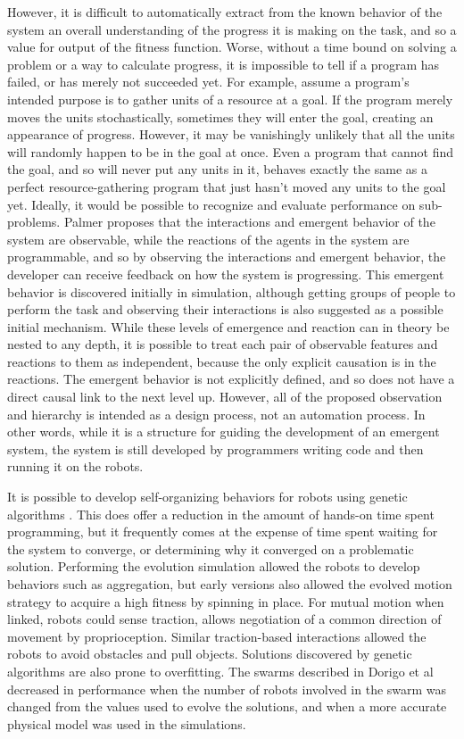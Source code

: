 \documentclass[]{article}
\begin{document}
However, it is difficult to automatically extract from the known behavior of the system an overall understanding of the progress it is making on the task, and so a value for output of the fitness function. 
Worse, without a time bound on solving a problem or a way to calculate progress, it is impossible to tell if a program has failed, or has merely not succeeded yet.
For example, assume a program's intended purpose is to gather units of a resource at a goal. 
If the program merely moves the units stochastically, sometimes they will enter the goal, creating an appearance of progress. 
However, it may be vanishingly unlikely that all the units will randomly happen to be in the goal at once. 
Even a program that cannot find the goal, and so will never put any units in it, behaves exactly the same as a perfect resource-gathering program that just hasn't moved any units to the goal yet. 
Ideally, it would be possible to recognize and evaluate performance on sub-problems. 
Palmer proposes that the interactions and emergent behavior of the system are observable, while the reactions of the agents in the system are programmable, and so by observing the interactions and emergent behavior, the developer can receive feedback on how the system is progressing. 
This emergent behavior is discovered initially in simulation, although getting groups of people to perform the task and observing their interactions is also suggested as a possible initial mechanism.
While these levels of emergence and reaction can in theory be nested to any depth, it is possible to treat each pair of observable features and reactions to them as independent, because the only explicit causation is in the reactions. 
The emergent behavior is not explicitly defined, and so does not have a direct causal link to the next level up. 
However, all of the proposed observation and hierarchy is intended as a design process, not an automation process. 
In other words, while it is a structure for guiding the development of an emergent system, the system is still developed by programmers writing code and then running it on the robots.

It is possible to develop self-organizing behaviors for robots using genetic algorithms \cite{dorigo2004evolving}. 
This does offer a reduction in the amount of hands-on time spent programming, but it frequently comes at the expense of time spent waiting for the system to converge, or determining why it converged on a problematic solution. 
Performing the evolution simulation allowed the robots to develop behaviors such as aggregation, but early versions also allowed the evolved motion strategy to acquire a high fitness by spinning in place. 
For mutual motion when linked, robots could sense traction, allows negotiation of a common direction of movement by proprioception. 
Similar traction-based interactions allowed the robots to avoid obstacles and pull objects. 
Solutions discovered by genetic algorithms are also prone to overfitting. 
The swarms described in Dorigo et al decreased in performance when the number of robots involved in the swarm was changed from the values used to evolve the solutions, and when a more accurate physical model was used in the simulations.
\end{document}
